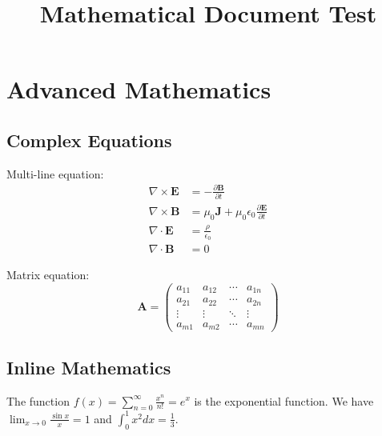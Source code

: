 \documentclass{article}
\title{Mathematical Document Test}
\begin{document}
\section{Advanced Mathematics}

\subsection{Complex Equations}

Multi-line equation:
\begin{align}
\nabla \times \mathbf{E} &= -\frac{\partial \mathbf{B}}{\partial t} \\
\nabla \times \mathbf{B} &= \mu_0 \mathbf{J} + \mu_0 \epsilon_0 \frac{\partial \mathbf{E}}{\partial t} \\
\nabla \cdot \mathbf{E} &= \frac{\rho}{\epsilon_0} \\
\nabla \cdot \mathbf{B} &= 0
\end{align}

Matrix equation:
\begin{equation}
\mathbf{A} = \begin{pmatrix}
a_{11} & a_{12} & \cdots & a_{1n} \\
a_{21} & a_{22} & \cdots & a_{2n} \\
\vdots & \vdots & \ddots & \vdots \\
a_{m1} & a_{m2} & \cdots & a_{mn}
\end{pmatrix}
\end{equation}

\subsection{Inline Mathematics}

The function $f(x) = \sum_{n=0}^{\infty} \frac{x^n}{n!} = e^x$ is the exponential function.
We have $\lim_{x \to 0} \frac{\sin x}{x} = 1$ and $\int_0^1 x^2 dx = \frac{1}{3}$.
\end{document}
